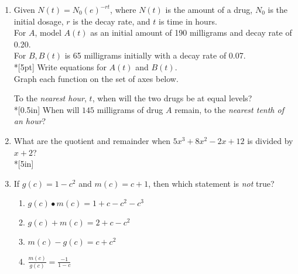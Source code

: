 \documentclass[12pt, oneside]{article}
\begin{document}
\begin{enumerate}
\item Given $N(t)=N_0(e)^{-rt}$, where $N(t)$ is the amount of a drug, $N_0$ is the initial dosage, $r$ is the decay rate, and $t$ is time in hours.\\[5pt] For $A$, model $A(t)$ as an initial amount of 190 milligrams and decay rate of 0.20.\\[5pt]
For $B, B(t)$ is 65 milligrams initially with a decay rate of 0.07.\\*[5pt]
Write equations for $A(t)$ and $B(t)$.\\[.75in]
Graph each function on the set of axes below.
\begin{center}
\end{center}
To the \emph{nearest hour}, $t$, when will the two drugs be at equal levels?\\*[0.5in]
When will $145$ milligrams of drug $A$ remain, to the \emph{nearest tenth of an hour}? 

\newpage

\item What are the quotient and remainder when $5x^3+8x^2-2x+12$ is divided by $x + 2$? \\*[5in]

\item If $g(c)=1-c^2$ and $m(c)=c+1$, then which statement is \emph{not} true?
\begin{enumerate}
    \item $g(c) \bullet m(c) = 1+c-c^2-c^3$
    \item $g(c) + m(c) = 2+c-c^2$
    \item $m(c) - g(c) = c+c^2$
    \item $\displaystyle \frac{m(c)}{g(c)} = \frac{-1}{1-c}$
\end{enumerate} %


\end{enumerate}
\end{document}
